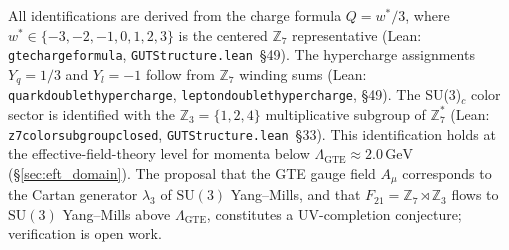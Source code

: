 \documentclass[11pt]{article}
\theoremstyle{remark}
\newcommand{\lean}[1]{%
  \penalty-100
  \begingroup\def\_{\textunderscore\allowbreak}\texttt{#1}\endgroup}
\begin{document}
\begin{appendices}
All identifications are derived from the charge formula $Q = w^*/3$, where
$w^* \in \{-3,-2,-1,0,1,2,3\}$ is the centered $\mathbb{Z}_7$ representative
(Lean: \lean{gte\_charge\_formula}, \texttt{GUTStructure.lean}~\S49).
The hypercharge assignments $Y_q = 1/3$ and $Y_l = -1$ follow from $\mathbb{Z}_7$
winding sums (Lean: \lean{quark\_doublet\_hypercharge},
\lean{lepton\_doublet\_hypercharge}, \S49).
The SU(3)$_c$ color sector is identified with the $\mathbb{Z}_3 = \{1,2,4\}$
multiplicative subgroup of $\mathbb{Z}_7^*$
(Lean: \lean{z7\_color\_subgroup\_closed}, \texttt{GUTStructure.lean}~\S33).
This identification holds at the effective-field-theory level for momenta below
$\Lambda_{\mathrm{GTE}} \approx 2.0\,\mathrm{GeV}$ (§\ref{sec:eft_domain}).
The proposal that the GTE gauge field $A_\mu$ corresponds to the Cartan generator
$\lambda_3$ of $\mathrm{SU}(3)$ Yang--Mills, and that $F_{21} = \mathbb{Z}_7 \rtimes \mathbb{Z}_3$
flows to $\mathrm{SU}(3)$ Yang--Mills above $\Lambda_{\mathrm{GTE}}$, constitutes a
UV-completion conjecture; verification is open work.

\end{appendices}



\end{document}
